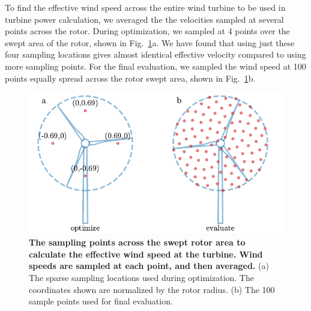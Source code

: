 \documentclass[wes, manuscript]{copernicus}
\begin{document}
To find the effective wind speed across the entire wind turbine to be used in turbine power calculation, we averaged the the velocities sampled at several points across the rotor. During optimization, we sampled at 4 points over the swept area of the rotor, shown in Fig.~\ref{fig:samples}a. We have found that using just these four sampling locations gives almost identical effective velocity compared to using more sampling points. For the final evaluation, we sampled the wind speed at 100 points equally spread across the rotor swept area, shown in Fig.~\ref{fig:samples}b.
%
\begin{figure}
\centering
\includegraphics{paper-figures/rotor_samples.pdf}
\caption{\textbf{The sampling points across the swept rotor area to calculate the effective wind speed at the turbine. Wind speeds are sampled at each point, and then averaged.} (a) The sparse sampling locations used during optimization. The coordinates shown are normalized by the rotor radius. (b) The 100 sample points used for final evaluation.}
\label{fig:samples}
\end{figure}
%
\end{document}

